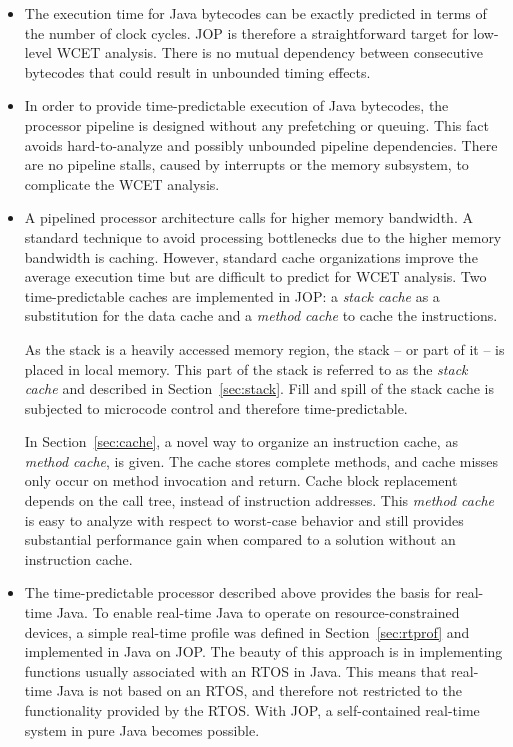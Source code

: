 \begin{itemize}

        \item
The execution time for Java bytecodes can be exactly predicted in
terms of the number of clock cycles.
JOP is therefore a straightforward target for low-level WCET
analysis. There is no mutual dependency between consecutive
bytecodes that could result in unbounded timing effects.

    \item
In order to provide time-predictable execution of Java bytecodes,
the processor pipeline is designed without any prefetching or
queuing. This fact avoids hard-to-analyze and possibly unbounded
pipeline dependencies. There are no pipeline stalls, caused by
interrupts or the memory subsystem, to complicate the WCET analysis.

    \item
A pipelined processor architecture calls for higher memory
bandwidth. A standard technique to avoid processing bottlenecks due
to the higher memory bandwidth is caching.
However, standard cache organizations improve the average
execution time but are difficult to predict for WCET analysis.
Two time-predictable caches are implemented in JOP: a \emph{stack
cache} as a substitution for the data cache and a \emph{method
cache} to cache the instructions.

As the stack is a heavily accessed memory region, the stack -- or
part of it -- is placed in local memory. This part of the stack is
referred to as the \emph{stack cache} and described in
Section~\ref{sec:stack}. Fill and spill of the stack cache is
subjected to microcode control and therefore time-predictable.

In Section~\ref{sec:cache}, a novel way to organize an
instruction cache, as \emph{method cache}, is given. The cache
stores complete methods, and cache misses only occur on method
invocation and return. Cache block replacement depends on the
call tree, instead of instruction addresses. This \emph{method
cache} is easy to analyze with respect to worst-case behavior and
still provides substantial performance gain when compared to a
solution without an instruction cache.

    \item The time-predictable processor described above provides
        the basis for real-time Java. To enable real-time Java to
        operate on resource-constrained devices, a simple
        real-time profile was defined in Section~\ref{sec:rtprof}
        and implemented in Java on JOP. The beauty of this
        approach is in implementing functions usually associated
        with an RTOS in Java. This means that real-time Java is
        not based on an RTOS, and therefore not restricted to the
        functionality provided by the RTOS. With JOP, a
        self-contained real-time system in pure Java becomes
        possible.


\end{itemize}
